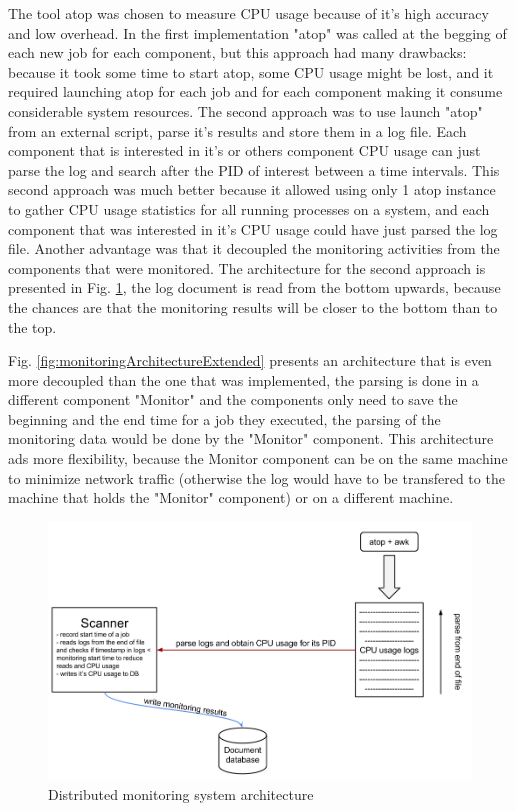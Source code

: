 \documentclass[fleqn,10pt]{./class/wlscirep}
\begin{document}
The tool atop was chosen to measure CPU usage because of it's high accuracy and low overhead. In the first implementation "atop" was called at the begging of each new job for each component, but this approach had many drawbacks: because it took some time to start atop, some CPU usage might be lost, and it required launching atop for each job and for each component making it consume considerable system resources. The second approach was to use launch "atop" from an external script, parse it's results and store them in a log file. Each component that is interested in it's or others component CPU usage can just parse the log and search after the PID of interest between a time intervals. This second approach was much better because it allowed using only 1 atop instance to gather CPU usage statistics for all running processes on a system, and each component that was interested in it's CPU usage could have just parsed the log file. Another advantage was that it decoupled the monitoring activities from the components that were monitored. The architecture for the second approach is presented in Fig. \ref{fig:monitoringArchitecture}, the log document is read from the bottom upwards, because the chances are that the monitoring results will be closer to the bottom than to the top.

Fig. \ref{fig:monitoringArchitectureExtended}  presents an architecture that is even more decoupled than the one that was implemented, the parsing is done in a different component "Monitor" and the components only need to save the beginning and the end time for a job they executed, the parsing of the monitoring data would be done by the "Monitor" component. This architecture ads more flexibility, because the Monitor component can be on the same machine to minimize network traffic (otherwise the log would have to be transfered to the machine that holds the "Monitor" component) or on a different machine.

\begin{figure}[ht]
\centering
\includegraphics[width=\linewidth]{./img/MonitoringCPUMechanism.png}
\caption{Distributed monitoring system architecture}
\label{fig:monitoringArchitecture}
\end{figure}
\end{document}
